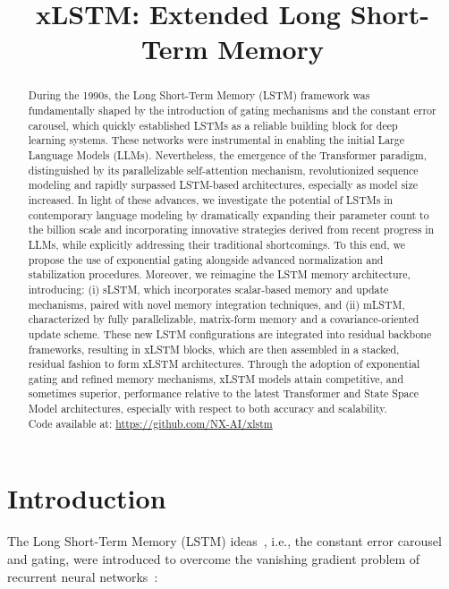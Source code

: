 \title{xLSTM: Extended Long Short-Term Memory}

\begin{abstract}
During the 1990s, the Long Short-Term Memory (LSTM) framework was fundamentally shaped by the introduction of gating mechanisms and the constant error carousel, which quickly established LSTMs as a reliable building block for deep learning systems. These networks were instrumental in enabling the initial Large Language Models (LLMs). Nevertheless, the emergence of the Transformer paradigm, distinguished by its parallelizable self-attention mechanism, revolutionized sequence modeling and rapidly surpassed LSTM-based architectures, especially as model size increased. In light of these advances, we investigate the potential of LSTMs in contemporary language modeling by dramatically expanding their parameter count to the billion scale and incorporating innovative strategies derived from recent progress in LLMs, while explicitly addressing their traditional shortcomings. To this end, we propose the use of exponential gating alongside advanced normalization and stabilization procedures. Moreover, we reimagine the LSTM memory architecture, introducing: (i) sLSTM, which incorporates scalar-based memory and update mechanisms, paired with novel memory integration techniques, and (ii) mLSTM, characterized by fully parallelizable, matrix-form memory and a covariance-oriented update scheme. These new LSTM configurations are integrated into residual backbone frameworks, resulting in xLSTM blocks, which are then assembled in a stacked, residual fashion to form xLSTM architectures. Through the adoption of exponential gating and refined memory mechanisms, xLSTM models attain competitive, and sometimes superior, performance relative to the latest Transformer and State Space Model architectures, especially with respect to both accuracy and scalability.\\
Code available at: \url{https://github.com/NX-AI/xlstm}
\end{abstract}

\section{Introduction}
\label{sec:intro}

The Long Short-Term Memory (LSTM) ideas~\citep{Hochreiter:91,Hochreiter:97nips,Hochreiter:97}, i.e., the constant error carousel and gating, were introduced to overcome the vanishing gradient problem of recurrent neural networks~\citep{Hochreiter:91,Hochreiter:00book}:

